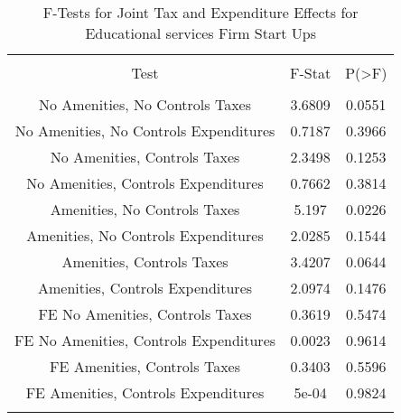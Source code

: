 
\begin{table}[!htbp] \centering 
  \caption{F-Tests for Joint Tax and Expenditure Effects for Educational services Firm Start Ups} 
  \label{61Ftests} 
\begin{tabular}{@{\extracolsep{5pt}} ccc} 
\\[-1.8ex]\hline 
\hline \\[-1.8ex] 
Test & F-Stat & P(\textgreater F) \\ 
\hline \\[-1.8ex] 
No Amenities, No Controls Taxes & 3.6809 & 0.0551 \\ 
No Amenities, No Controls Expenditures & 0.7187 & 0.3966 \\ 
No Amenities, Controls Taxes & 2.3498 & 0.1253 \\ 
No Amenities, Controls Expenditures & 0.7662 & 0.3814 \\ 
Amenities, No Controls Taxes & 5.197 & 0.0226 \\ 
Amenities, No Controls Expenditures & 2.0285 & 0.1544 \\ 
Amenities, Controls Taxes & 3.4207 & 0.0644 \\ 
Amenities, Controls Expenditures & 2.0974 & 0.1476 \\ 
FE No Amenities, Controls Taxes & 0.3619 & 0.5474 \\ 
FE No Amenities, Controls Expenditures & 0.0023 & 0.9614 \\ 
FE Amenities, Controls Taxes & 0.3403 & 0.5596 \\ 
FE Amenities, Controls Expenditures & 5e-04 & 0.9824 \\ 
\hline \\[-1.8ex] 
\end{tabular} 
\end{table} 
